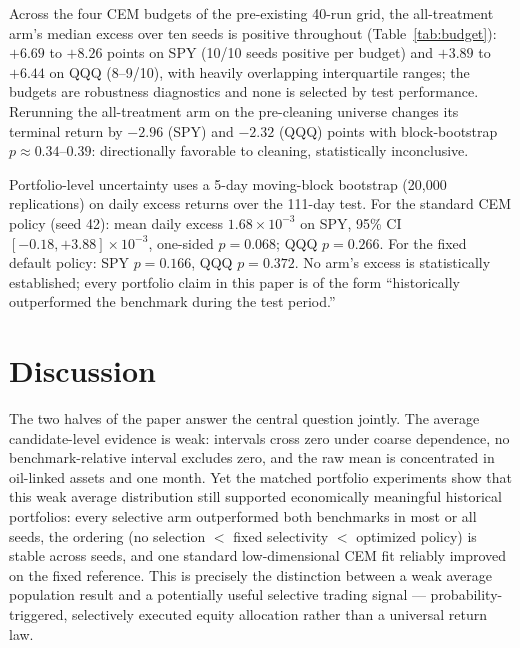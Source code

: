 \documentclass[sigconf,anonymous]{acmart}
\begin{document}
Across the four CEM budgets of the pre-existing 40-run grid, the all-treatment arm's median excess over ten seeds is positive throughout (Table~\ref{tab:budget}): $+6.69$ to $+8.26$ points on SPY (10/10 seeds positive per budget) and $+3.89$ to $+6.44$ on QQQ (8--9/10), with heavily overlapping interquartile ranges; the budgets are robustness diagnostics and none is selected by test performance. Rerunning the all-treatment arm on the pre-cleaning universe changes its terminal return by $-2.96$ (SPY) and $-2.32$ (QQQ) points with block-bootstrap $p\approx0.34$--$0.39$: directionally favorable to cleaning, statistically inconclusive.



Portfolio-level uncertainty uses a 5-day moving-block bootstrap (20,000 replications) on daily excess returns over the 111-day test. For the standard CEM policy (seed 42): mean daily excess $1.68\times10^{-3}$ on SPY, 95\% CI $[-0.18,+3.88]\times10^{-3}$, one-sided $p=0.068$; QQQ $p=0.266$. For the fixed default policy: SPY $p=0.166$, QQQ $p=0.372$. No arm's excess is statistically established; every portfolio claim in this paper is of the form ``historically outperformed the benchmark during the test period.''

\section{Discussion}

The two halves of the paper answer the central question jointly. The average candidate-level evidence is weak: intervals cross zero under coarse dependence, no benchmark-relative interval excludes zero, and the raw mean is concentrated in oil-linked assets and one month. Yet the matched portfolio experiments show that this weak average distribution still supported economically meaningful historical portfolios: every selective arm outperformed both benchmarks in most or all seeds, the ordering (no selection $<$ fixed selectivity $<$ optimized policy) is stable across seeds, and one standard low-dimensional CEM fit reliably improved on the fixed reference. This is precisely the distinction between a weak average population result and a potentially useful selective trading signal --- probability-triggered, selectively executed equity allocation rather than a universal return law.
\end{document}
